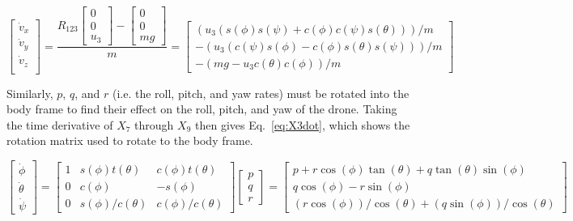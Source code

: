 \documentclass[letterpaper, paper,11pt]{AAS}	%
\begin{document}
\begin{equation}
\label{eq:X2dot}
\begin{bmatrix}
\dot{v}_x\\
\dot{v}_y\\
\dot{v}_z\\
\end{bmatrix}
= \frac{R_{123}
\begin{bmatrix}
0\\
0\\
u_3
\end{bmatrix}
-
\begin{bmatrix}
0\\
0\\
mg
\end{bmatrix}}{m}=
\begin{bmatrix}
(u_3(s(\phi)s(\psi) + c(\phi)c(\psi)s(\theta)))/m \\
-(u_3(c(\psi)s(\phi) - c(\phi)s(\theta)s(\psi)))/m \\
-(mg - u_3c(\theta)c(\phi))/m
\end{bmatrix}
\end{equation}

Similarly, $p$, $q$, and $r$ (i.e. the roll, pitch, and yaw rates) must be rotated into the body frame to find their effect on the roll, pitch, and yaw of the drone. Taking the time derivative of $X_7$ through $X_9$ then gives Eq.~\eqref{eq:X3dot}, which shows the rotation matrix used to rotate to the body frame.

\begin{equation}
\label{eq:X3dot}
\begin{bmatrix}
\dot{\phi}\\
\dot{\theta}\\
\dot{\psi}
\end{bmatrix}=
\begin{bmatrix}
1& s(\phi)t(\theta)&  c(\phi)t(\theta)\\
0& c(\phi)&          -s(\phi)\\
0& s(\phi)/c(\theta)&c(\phi)/c(\theta)
\end{bmatrix}
\begin{bmatrix}
p\\
q\\
r
\end{bmatrix}=
\begin{bmatrix}
p + r\cos(\phi)\tan(\theta) + q\tan(\theta)\sin(\phi) \\
q\cos(\phi) - r\sin(\phi) \\
(r\cos(\phi))/\cos(\theta) + (q\sin(\phi))/\cos(\theta)
\end{bmatrix}
\end{equation}
\end{document}
